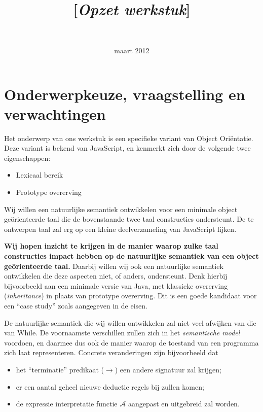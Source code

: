 \documentclass[a4paper,11pt]{article}
\title{\Title \\ {\Large [\textit{Opzet werkstuk}]}}
\author{\Kelley \\ \Tim}
\date{maart 2012}
\begin{document}
\maketitle
\thispagestyle{fancy}

\section*{Onderwerpkeuze, vraagstelling en verwachtingen}

Het onderwerp van ons werkstuk is een specifieke variant van Object Oriëntatie. Deze variant is bekend van JavaScript, en kenmerkt zich door de volgende twee eigenschappen:

\begin{itemize}
	\item Lexicaal bereik
	\item Prototype overerving
\end{itemize}

Wij willen een natuurlijke semantiek ontwikkelen voor een minimale object geörienteerde taal die de bovenstaande twee taal constructies ondersteunt. De te ontwerpen taal zal erg op een kleine deelverzameling van JavaScript lijken.

\textbf{Wij hopen inzicht te krijgen in de manier waarop zulke taal constructies impact hebben op de natuurlijke semantiek van een object geörienteerde taal.} Daarbij willen wij ook een natuurlijke semantiek ontwikkelen die deze aspecten niet, of anders, ondersteunt. Denk hierbij bijvoorbeeld aan een minimale versie van Java, met klassieke overerving (\emph{inheritance}) in plaats van prototype overerving. Dit is een goede kandidaat voor een ``case study'' zoals aangegeven in de eisen.

De natuurlijke semantiek die wij willen ontwikkelen zal niet veel afwijken van die van While. De voornaamste verschillen zullen zich in het \emph{semantische model} voordoen, en daarmee dus ook de manier waarop de toestand van een programma zich laat representeren. Concrete veranderingen zijn bijvoorbeeld dat

\begin{itemize}
	\item het ``terminatie'' predikaat ($\longrightarrow$) een andere signatuur zal krijgen;
	\item er een aantal geheel nieuwe deductie regels bij zullen komen;
	\item de expressie interpretatie functie $\mathcal{A}$ aangepast en uitgebreid zal worden.
\end{itemize}
\end{document}
